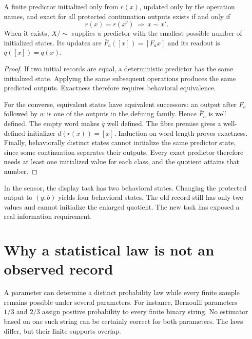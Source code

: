 \begin{Coretheorem}\label{Core:r:behavior}
A finite predictor initialized only from $r(x)$, updated only by the operation names, and exact for all protected continuation outputs exists if and only if
\[
r(x)=r(x')\ \Longrightarrow\ x\sim x'.
\]
When it exists, $X/{\sim}$ supplies a predictor with the smallest possible number of initialized states. Its updates are $\bar F_a([x])=[F_ax]$ and its readout is $\bar q([x])=q(x)$.
\end{Coretheorem}
\begin{proof}
If two initial records are equal, a deterministic predictor has the same initialized state. Applying the same subsequent operations produces the same predicted outputs. Exactness therefore requires behavioral equivalence.

For the converse, equivalent states have equivalent successors: an output after $F_a$ followed by $w$ is one of the outputs in the defining family. Hence $\bar F_a$ is well defined. The empty word makes $\bar q$ well defined. The fibre premise gives a well-defined initializer $d(r(x))=[x]$. Induction on word length proves exactness. Finally, behaviorally distinct states cannot initialize the same predictor state, since some continuation separates their outputs. Every exact predictor therefore needs at least one initialized value for each class, and the quotient attains that number.
\end{proof}

In the sensor, the display task has two behavioral states. Changing the protected output to $(y,b)$ yields four behavioral states. The old record still has only two values and cannot initialize the enlarged quotient. The new task has exposed a real information requirement.

\section{Why a statistical law is not an observed record}
A parameter can determine a distinct probability law while every finite sample remains possible under several parameters. For instance, Bernoulli parameters $1/3$ and $2/3$ assign positive probability to every finite binary string. No estimator based on one such string can be certainly correct for both parameters. The laws differ, but their finite supports overlap.

